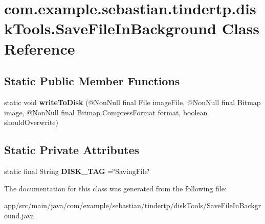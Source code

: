 \hypertarget{classcom_1_1example_1_1sebastian_1_1tindertp_1_1diskTools_1_1SaveFileInBackground}{}\section{com.\+example.\+sebastian.\+tindertp.\+disk\+Tools.\+Save\+File\+In\+Background Class Reference}
\label{classcom_1_1example_1_1sebastian_1_1tindertp_1_1diskTools_1_1SaveFileInBackground}
\subsection*{Static Public Member Functions}
\begin{DoxyCompactItemize}
\item 
static void {\bfseries write\+To\+Disk} (@Non\+Null final File image\+File, @Non\+Null final Bitmap image, @Non\+Null final Bitmap.\+Compress\+Format format, boolean should\+Overwrite)\hypertarget{classcom_1_1example_1_1sebastian_1_1tindertp_1_1diskTools_1_1SaveFileInBackground_a05d276300b87e1962ca400613b496ab2}{}\label{classcom_1_1example_1_1sebastian_1_1tindertp_1_1diskTools_1_1SaveFileInBackground_a05d276300b87e1962ca400613b496ab2}

\end{DoxyCompactItemize}
\subsection*{Static Private Attributes}
\begin{DoxyCompactItemize}
\item 
static final String {\bfseries D\+I\+S\+K\+\_\+\+T\+AG} =\char`\"{}Saving\+File\char`\"{}\hypertarget{classcom_1_1example_1_1sebastian_1_1tindertp_1_1diskTools_1_1SaveFileInBackground_a8457ac962e2b6270b7d1b0fc7e03b264}{}\label{classcom_1_1example_1_1sebastian_1_1tindertp_1_1diskTools_1_1SaveFileInBackground_a8457ac962e2b6270b7d1b0fc7e03b264}

\end{DoxyCompactItemize}


The documentation for this class was generated from the following file\+:\begin{DoxyCompactItemize}
\item 
app/src/main/java/com/example/sebastian/tindertp/disk\+Tools/Save\+File\+In\+Background.\+java\end{DoxyCompactItemize}
